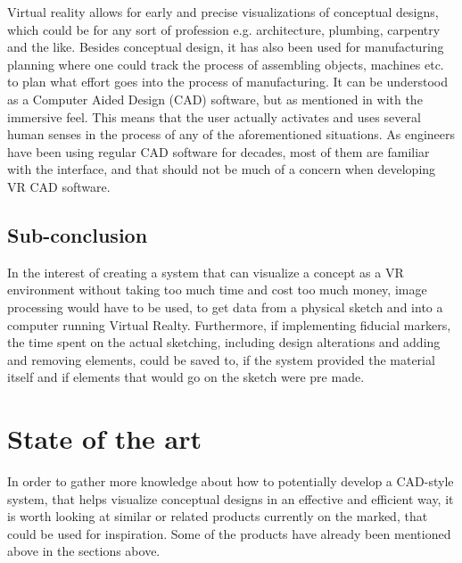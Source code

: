 	Virtual reality allows for early and precise visualizations of conceptual designs, which could be for any sort of profession e.g. architecture, plumbing, carpentry and the like. Besides conceptual design, it has also been used for manufacturing planning where one could track the process of assembling objects, machines etc. to plan what effort goes into the process of manufacturing. It can be understood as a Computer Aided Design (CAD) software, but as mentioned in \cite{engineeringVR} with the immersive feel. This means that the user actually activates and uses several human senses in the process of any of the aforementioned situations. As engineers have been using regular CAD software for decades, most of them are familiar with the interface, and that should not be much of a concern when developing VR CAD software.

	\subsection{Sub-conclusion}
	In the interest of creating a system that can visualize a concept as a VR environment without taking too much time and cost too much money, image processing would have to be used, to get data from a physical sketch and into a computer running Virtual Realty. Furthermore, if implementing fiducial markers, the time spent on the actual sketching, including design alterations and adding and removing elements, could be saved to, if the system provided the material itself and if elements that would go on the sketch were pre made.

    \section{State of the art}\label{sec:SOTA}
    In order to gather more knowledge about how to potentially develop a CAD-style system, that helps visualize conceptual designs in an effective and efficient way, it is worth looking at similar or related products currently on the marked, that could be used for inspiration. Some of the products have already been mentioned above in the sections above.
	  

